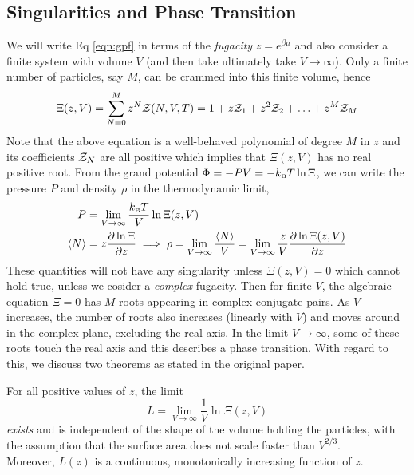 \subsection{Singularities and Phase Transition}
We will write Eq \eqref{eqn:gpf} in terms of the \textit{fugacity} $z=e^{\beta\mu}$ and also consider a finite system with volume $V$ (and then take ultimately take $V\to \infty$). Only a finite number of particles, say $M$, can be crammed into this finite volume, hence 
\begin{equation}
    \label{eqn:fug}
    \Xi(z,V) = \sum\limits_{N=0}^{M}z^N \mathcal Z(N,V,T)  = 1+z\mathcal Z_1+z^2\mathcal Z_2+\ldots+z^M\mathcal Z_M
\end{equation}
Note that the above equation is a well-behaved polynomial of degree $M$ in $z$  and its coefficients $\mathcal Z_N$ are all positive which implies that $\Xi(z,V)$ has no real positive root. From the grand potential $\Phi=-PV = -k_{\text{\tiny B}} T\ln\Xi$, we can write the pressure $P$ and density $\rho$ in the thermodynamic limit,
\begin{align}\label{eqn:rhoP}
   \begin{split}
     P &=\lim\limits_{V\to\infty} \frac{k_{\text{\tiny B}} T}{V}\ln \Xi(z,V)\\
    \left\langle N \right\rangle &= z\pdv{\ln\Xi}{z}\implies \rho = \lim\limits_{V\to\infty} \frac{\left\langle N \right\rangle}{V} =\lim\limits_{V\to\infty} \frac{z}{V}\pdv{\ln\Xi(z,V)}{z}
   \end{split}
\end{align}
These quantities will not have any singularity unless $\Xi(z,V)=0$ which cannot hold true, unless we cosider a \textit{complex} fugacity. Then for finite $V$, the algebraic equation $\Xi =0$ has $M$ roots appearing in complex-conjugate pairs. As $V$ increases, the number of roots also increases (linearly with $V$) and moves around in the complex plane, excluding the real axis. In the limit $V\to\infty$, some of these roots touch the real axis and this describes a phase transition. With regard to this, we discuss two theorems as stated in the original paper.
\begin{theorem}\label{thm:1}
    For all positive values of $z$, the limit $$L = \lim\limits_{V\to\infty}\frac{1}{V}\ln\Xi(z,V)$$ \textit{exists} and is independent of the shape of the volume holding the particles, with the assumption that the surface area does not scale faster than $ V^{2/3}$. \\[0.2cm]
    Moreover, $L(z)$ is a continuous, monotonically increasing function of $z$. 
\end{theorem}

